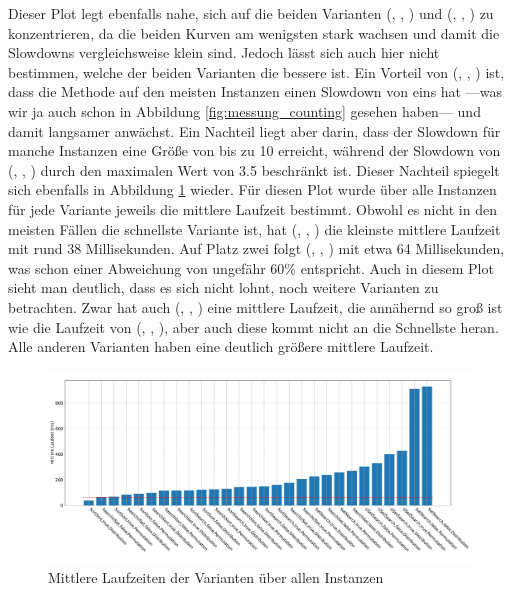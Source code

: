 Dieser Plot legt ebenfalls nahe, sich auf die beiden Varianten (\SeaUSet, \false, \perm) und 
(\SorSor, \true, \distr) zu konzentrieren, da die beiden Kurven am wenigsten stark wachsen und damit 
die Slowdowns vergleichsweise klein sind. Jedoch lässt sich auch hier nicht bestimmen, welche der beiden
Varianten die bessere ist. Ein Vorteil von (\SeaUSet, \false, \perm) ist, 
dass die Methode auf den meisten Instanzen einen Slowdown
von eins hat ---was wir ja auch schon in Abbildung \ref{fig:messung_counting} gesehen haben---
und damit langsamer anwächst. Ein Nachteil liegt aber darin, dass der Slowdown für manche Instanzen
eine Größe von bis zu 10 erreicht, während der Slowdown von  (\SorSor, \true, \distr) durch den maximalen
Wert von 3.5 beschränkt ist.
\newpage
Dieser Nachteil spiegelt sich ebenfalls in Abbildung \ref{fig:messung_mean} wieder. Für diesen Plot
wurde über alle Instanzen für jede Variante jeweils die mittlere Laufzeit bestimmt. Obwohl
es nicht in den meisten Fällen die schnellste Variante ist, hat (\SorSor, \true, \distr) die 
kleinste mittlere Laufzeit mit rund 38 Millisekunden. Auf Platz zwei folgt
(\SeaUSet, \false, \perm) mit etwa 64 Millisekunden, was schon einer Abweichung von ungefähr 60\% entspricht.
Auch in diesem Plot sieht man deutlich, dass es sich nicht lohnt, noch weitere Varianten zu betrachten. Zwar hat 
auch (\SorSor, \true, \perm) eine mittlere Laufzeit, 
die annähernd so groß ist wie die Laufzeit von (\SeaUSet, \false, \perm), aber 
auch diese kommt nicht an die Schnellste heran. Alle anderen Varianten 
haben eine deutlich größere mittlere Laufzeit.
\begin{figure}
\centering
	\includegraphics[width = \textwidth]{figures/mean.pdf}
	\caption{Mittlere Laufzeiten der Varianten über allen Instanzen}
	\label{fig:messung_mean}
\end{figure}
\\


